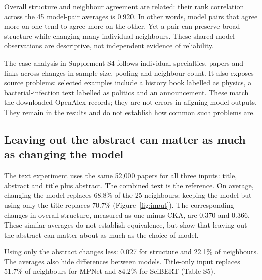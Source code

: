 Overall structure and neighbour agreement are related: their rank correlation across the 45 model-pair averages is 0.920. In other words, model pairs that agree more on one tend to agree more on the other. Yet a pair can preserve broad structure while changing many individual neighbours. These shared-model observations are descriptive, not independent evidence of reliability.

The case analysis in Supplement S4 follows individual specialties, papers and links across changes in sample size, pooling and neighbour count. It also exposes source problems: selected examples include a history book labelled as physics, a bacterial-infection text labelled as politics and an announcement. These match the downloaded OpenAlex records; they are not errors in aligning model outputs. They remain in the results and do not establish how common such problems are.

\subsection{Leaving out the abstract can matter as much as changing the model}
The text experiment uses the same 52,000 papers for all three inputs: title, abstract and title plus abstract. The combined text is the reference. On average, changing the model replaces 68.8\% of the 25 neighbours; keeping the model but using only the title replaces 70.7\% (Figure~\ref{fig:input}). The corresponding changes in overall structure, measured as one minus CKA, are 0.370 and 0.366. These similar averages do not establish equivalence, but show that leaving out the abstract can matter about as much as the choice of model.

Using only the abstract changes less: 0.027 for structure and 22.1\% of neighbours. The averages also hide differences between models. Title-only input replaces 51.7\% of neighbours for MPNet and 84.2\% for SciBERT (Table S5).

